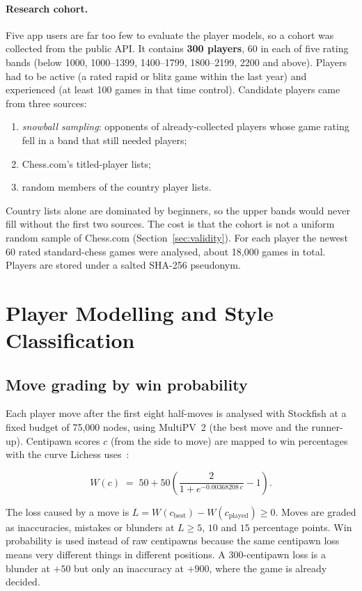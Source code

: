 \paragraph{Research cohort.} Five app users are far too few to evaluate the player models, so a
cohort was collected from the public API. It contains \textbf{300 players}, 60 in each of five rating
bands (below 1000, 1000--1399, 1400--1799, 1800--2199, 2200 and above). Players had to be active (a
rated rapid or blitz game within the last year) and experienced (at least 100 games in that time
control). Candidate players came from three sources:
\begin{enumerate}
  \item \emph{snowball sampling}: opponents of already-collected players whose game rating fell in a
        band that still needed players;
  \item Chess.com's titled-player lists;
  \item random members of the country player lists.
\end{enumerate}
Country lists alone are dominated by beginners, so the upper bands would never fill without the first
two sources. The cost is that the cohort is not a uniform random sample of Chess.com
(Section~\ref{sec:validity}). For each player the newest 60 rated standard-chess games were
analysed, about 18,000 games in total. Players are stored under a salted SHA-256 pseudonym.

\section{Player Modelling and Style Classification}\label{sec:player-model}

\subsection{Move grading by win probability}

Each player move after the first eight half-moves is analysed with Stockfish at a fixed budget of
75,000 nodes, using MultiPV~2 (the best move and the runner-up). Centipawn scores $c$ (from the side
to move) are mapped to win percentages with the curve Lichess uses~\cite{lichessaccuracy}:

\begin{equation}
  W(c) \;=\; 50 + 50\left(\frac{2}{1+e^{-0.00368208\,c}} - 1\right).
\end{equation}

\noindent The loss caused by a move is $L = W(c_{\text{best}}) - W(c_{\text{played}}) \geq 0$. Moves
are graded as inaccuracies, mistakes or blunders at $L\geq 5$, $10$ and $15$ percentage points. Win
probability is used instead of raw centipawns because the same centipawn loss means very different
things in different positions. A 300-centipawn loss is a blunder at $+50$ but only an inaccuracy at
$+900$, where the game is already decided.

